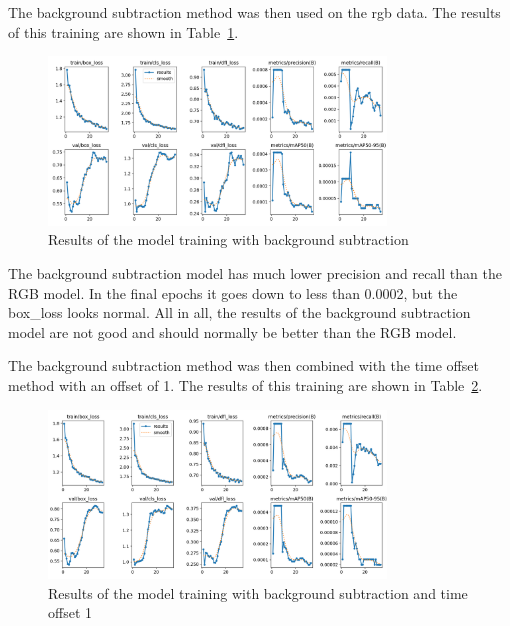 
The background subtraction method was then used on the rgb data. The results of this training are shown in Table~\ref{fig:results_bgsub}.

\begin{figure}[htbp] 
    \centering
    \includegraphics[width=0.8\textwidth]{images/results/bgsub_results.png}
    \caption{Results of the model training with background subtraction}
    \label{fig:results_bgsub}
\end{figure}

The background subtraction model has much lower precision and recall than the RGB model. In the final epochs it goes down to less than 0.0002, but the box\_loss looks normal. All in all, the results of the background subtraction model are not good and should normally be better than the RGB model.


The background subtraction method was then combined with the time offset method with an offset of 1. The results of this training are shown in Table~\ref{fig:results_bgsub_timeoffset1}.

\begin{figure}[htbp] 
    \centering
    \includegraphics[width=0.8\textwidth]{images/results/bgsub_timeoffset1_results.png}
    \caption{Results of the model training with background subtraction and time offset 1}
    \label{fig:results_bgsub_timeoffset1}
\end{figure}

